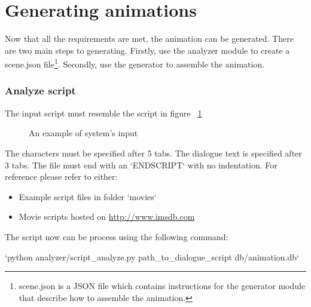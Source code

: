 \section{Generating animations \label{sec:generatormanual}}
\noindent Now that all the requirements are met, the animation can be generated. There are two main steps to generating. Firstly, use the analyzer module to create a scene.json file\footnote{scene.json is a JSON file which contains instructions for the generator module that describe how to assemble the animation.}. Secondly, use the generator to assemble the animation.

\subsubsection{Analyze script \label{sec:analyze-script}}
\noindent The input script must resemble the script in figure ~\ref{fig:inputscript2}

\begin{figure}[!ht]
	\centerline{}
	\caption{An example of system's input}\label{fig:inputscript2}
\end{figure}

\noindent The characters must be specified after 5 tabs. The dialogue text is specified after 3 tabs. The file must end with an `ENDSCRIPT` with no indentation. For reference please refer to either:
\begin{itemize}
	\item Example script files in folder `movies`
	\item Movie scripts hosted on \url{http://www.imsdb.com}
\end{itemize}

\noindent The script now can be process using the following command:

\indent `python analyzer/script\_analyze.py path\_to\_dialogue\_script db/animation.db`

